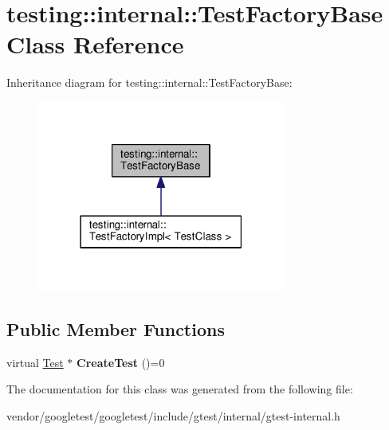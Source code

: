 \hypertarget{classtesting_1_1internal_1_1_test_factory_base}{}\section{testing\+:\+:internal\+:\+:Test\+Factory\+Base Class Reference}
\label{classtesting_1_1internal_1_1_test_factory_base}


Inheritance diagram for testing\+:\+:internal\+:\+:Test\+Factory\+Base\+:
\nopagebreak
\begin{figure}[H]
\begin{center}
\leavevmode
\includegraphics[width=231pt]{classtesting_1_1internal_1_1_test_factory_base__inherit__graph}
\end{center}
\end{figure}
\subsection*{Public Member Functions}
\begin{DoxyCompactItemize}
\item 
\mbox{\label{classtesting_1_1internal_1_1_test_factory_base_a07ac3ca0b196cdb092da0bb186b7c030}} 
virtual \mbox{\hyperlink{classtesting_1_1_test}{Test}} $\ast$ {\bfseries Create\+Test} ()=0
\end{DoxyCompactItemize}


The documentation for this class was generated from the following file\+:\begin{DoxyCompactItemize}
\item 
vendor/googletest/googletest/include/gtest/internal/gtest-\/internal.\+h\end{DoxyCompactItemize}
